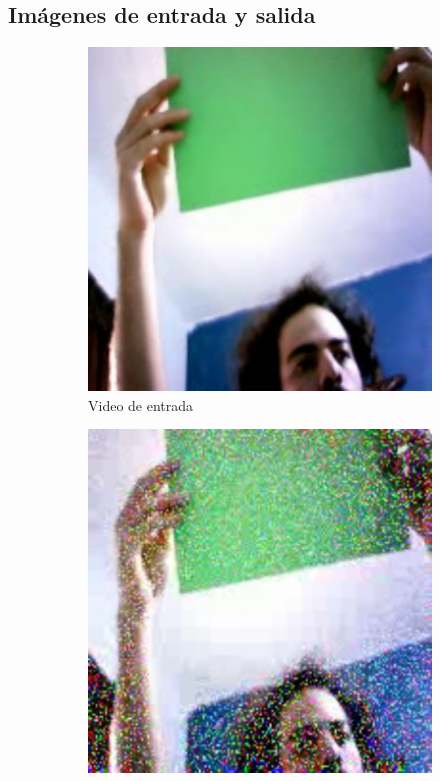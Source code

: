 \documentclass[12pt, oneside]{article}
\begin{document}
\newpage
\subsection{Imágenes de entrada y salida}
{\sffamily\large\justify
    \begin{figure}[h!]
        \centering

        \begin{subfigure}[tl]{0.35\textwidth}
            \centering
            \includegraphics[width=\linewidth]{video.jpg}
            \caption{\sffamily Video de entrada}
        \end{subfigure}
        \begin{subfigure}[tr]{0.35\textwidth}
            \centering
            \includegraphics[width=\linewidth]{noise.jpg}

\end{subfigure}
\end{figure}}
\end{document}
